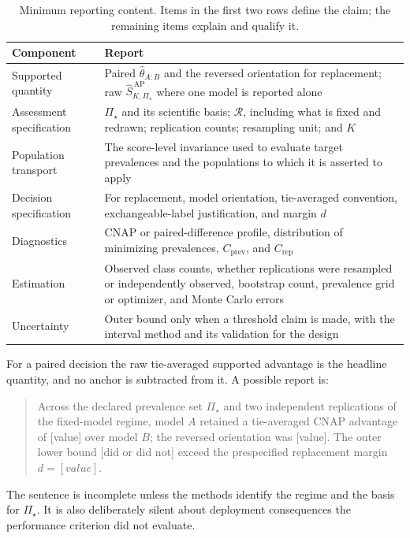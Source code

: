 \documentclass[11pt]{article}
\newcommand{\Regime}{\mathcal{R}}
\newcommand{\PSet}{\Pi_\star}
\newcommand{\SRobHat}{\widehat S_{K,\PSet}^{\,\mathrm{AP}}}
\theoremstyle{remark}
\begin{document}
\begin{table}[ht]
\centering
\caption{Minimum reporting content. Items in the first two rows define the claim; the remaining items explain and qualify it.}
\label{tab:reporting}
\begin{tabularx}{\textwidth}{@{}p{}X@{}}
\toprule
Component & Report \\
\midrule
Supported quantity &
Paired $\widehat\theta_{A:B}$ and the reversed orientation for replacement; raw $\SRobHat$ where one model is reported alone \\
Assessment specification &
$\PSet$ and its scientific basis; $\Regime$, including what is fixed and redrawn; replication counts; resampling unit; and $K$ \\
Population transport &
The score-level invariance used to evaluate target prevalences and the populations to which it is asserted to apply \\
Decision specification &
For replacement, model orientation, tie-averaged convention, exchangeable-label justification, and margin $d$ \\
Diagnostics &
CNAP or paired-difference profile, distribution of minimizing prevalences, $C_{\mathrm{prev}}$, and $C_{\mathrm{rep}}$ \\
Estimation &
Observed class counts, whether replications were resampled or independently observed, bootstrap count, prevalence grid or optimizer, and Monte Carlo errors \\
Uncertainty &
Outer bound only when a threshold claim is made, with the interval method and its validation for the design \\
\bottomrule
\end{tabularx}
\end{table}

For a paired decision the raw tie-averaged supported advantage is the headline quantity, and no anchor is subtracted from it. A possible report is:

\begin{quote}
Across the declared prevalence set $\PSet$ and two independent replications of the fixed-model regime, model $A$ retained a tie-averaged CNAP advantage of [value] over model $B$; the reversed orientation was [value]. The outer lower bound [did or did not] exceed the prespecified replacement margin $d=[value]$.
\end{quote}

The sentence is incomplete unless the methods identify the regime and the basis for $\PSet$. It is also deliberately silent about deployment consequences the performance criterion did not evaluate.
\end{document}
